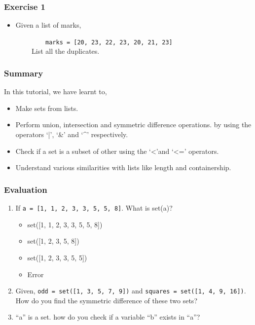 \documentclass[presentation]{beamer}
\begin{document}
\begin{frame}
\frametitle{Exercise 1}
\label{sec-4}


\begin{itemize}
\item Given a list of marks,
\end{itemize}
 ~~~~~~~~~~~~\verb~marks = [20, 23, 22, 23, 20, 21, 23]~ \\
\vspace{8pt} 
 ~~~~~~~~List all the duplicates.
\end{frame}
\begin{frame}
\frametitle{Summary}
\label{sec-5}

 In this tutorial, we have learnt to,


\begin{itemize}
\item Make sets from lists.
\item Perform union, intersection and symmetric difference operations.
   by using the operators `|', `\&' and `\textasciicircum'  respectively.
\item Check if a set is a subset of other using the `<'and `<=' operators.
\item Understand various similarities with lists like length and containership.
\end{itemize}
\end{frame}
\begin{frame}
\frametitle{Evaluation}
\label{sec-6}


\begin{enumerate}
\item If \verb~a = [1, 1, 2, 3, 3, 5, 5, 8]~. What is set(a)?
\vspace{3pt}
\begin{itemize}
\item set([1, 1, 2, 3, 3, 5, 5, 8])
\item set([1, 2, 3, 5, 8])
\item set([1, 2, 3, 3, 5, 5])
\item Error
\end{itemize}
\vspace{6pt}
\item Given,  \verb~odd = set([1, 3, 5, 7, 9])~ and \verb~squares = set([1, 4, 9, 16])~. \\
    How do you find the symmetric difference of these two sets?
\vspace{15pt}
\item ``a'' is a set. how do you check if a variable ``b'' exists in ``a''?
\end{enumerate}
\end{frame}
\end{document}
